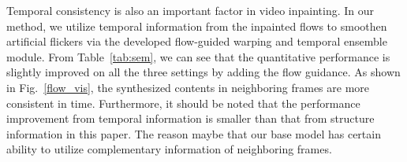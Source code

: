 Temporal consistency is also an important factor in video inpainting. 
In our method, we utilize temporal information from the inpainted flows to smoothen artificial flickers via the developed flow-guided warping and temporal ensemble module. 
From Table~\ref{tab:sem}, we can see that the quantitative performance is slightly improved on all the three settings by adding the flow guidance. 
As shown in Fig.~\ref{flow_vis}, the synthesized contents in neighboring frames are more consistent in time.
Furthermore, it should be noted that the performance improvement from temporal information is smaller than that from structure information in this paper.
The reason maybe that our base model has certain ability to utilize complementary information of neighboring frames.








